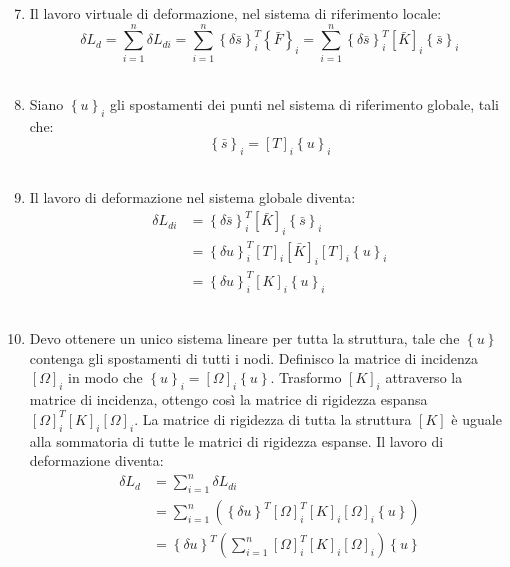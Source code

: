 \begin{enumerate}
 \setcounter{enumi}{6}
    \item Il lavoro virtuale di deformazione, nel sistema di riferimento locale:
    \begin{equation*}
        \delta L_d = \sum_{i=1}^n \delta L_{di} =  \sum_{i=1}^n\left\{\delta \bar{s}\right\}_i^T\left\{\bar{F}\right\}_i
        = \sum_{i=1}^n\left\{\delta \bar{s}\right\}_i^T  [\bar{K}]_i  \left\{ \bar{s}\right\}_i
    \end{equation*}\\
    \item Siano $\left\{u\right\}_i$ gli spostamenti dei punti nel sistema di riferimento globale, tali che:
    \begin{equation*}
        \left\{ \bar{s}\right\}_i = [T]_i \left\{u\right\}_i
    \end{equation*}\\
    \item Il lavoro di deformazione nel sistema globale diventa:
    \begin{align*}
        \delta L_{di}  &=\left\{\delta \bar{s}\right\}_i^T  [\bar{K}]_i  \left\{ \bar{s}\right\}_i\\
        &=\left\{\delta u\right\}_i^T   [T]_i [\bar{K}]_i  [T]_i  \left\{ u\right\}_i\\
        &=\left\{\delta u\right\}_i^T  [K]_i  \left\{u\right\}_i
    \end{align*}\\
    \item Devo ottenere un unico sistema lineare per tutta la struttura, tale che $\left\{u\right\}$ contenga gli spostamenti di tutti i nodi. Definisco la matrice di incidenza $[\Omega]_i$ in modo che $\left\{u\right\}_i=[\Omega]_i \left\{u\right\}$. Trasformo $[K]_i $ attraverso la matrice di incidenza, ottengo così la matrice di rigidezza espansa $[\Omega]_i^T  [K]_i  [\Omega]_i$. La matrice di rigidezza di tutta la struttura $[K]$ è uguale alla sommatoria di tutte le matrici di rigidezza espanse. Il lavoro di deformazione diventa:
    \begin{align*}
        \delta L_d  &=\sum_{i=1}^n \delta L_{di} \\
        &= \sum_{i=1}^n  \left(    \left\{\delta u\right\}^T  [\Omega]_i^T  [K]_i  [\Omega]_i  \left\{ u\right\}    \right)\\
         &= \left\{\delta u\right\}^T  \left(\sum_{i=1}^n      [\Omega]_i^T  [K]_i  [\Omega]_i     \right) \left\{u\right\}
    \end{align*}\\

\end{enumerate}
